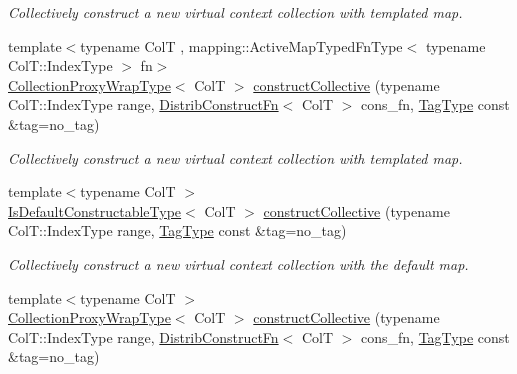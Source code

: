 \begin{DoxyCompactItemize}
\begin{DoxyCompactList}\small\item\em Collectively construct a new virtual context collection with templated map. \end{DoxyCompactList}\item 
{\footnotesize template$<$typename ColT , mapping\+::\+Active\+Map\+Typed\+Fn\+Type$<$ typename Col\+T\+::\+Index\+Type $>$ fn$>$ }\\\hyperlink{structvt_1_1vrt_1_1collection_1_1_collection_manager_a56458ed7f9bb22b631b9b3a745f42f94}{Collection\+Proxy\+Wrap\+Type}$<$ ColT $>$ \hyperlink{structvt_1_1vrt_1_1collection_1_1_collection_manager_a619d6e576f0d108e442b16ca4f68f1f3}{construct\+Collective} (typename Col\+T\+::\+Index\+Type range, \hyperlink{structvt_1_1vrt_1_1collection_1_1_collection_manager_a7503830bc133013d542856fa39834dcc}{Distrib\+Construct\+Fn}$<$ ColT $>$ cons\+\_\+fn, \hyperlink{namespacevt_a84ab281dae04a52a4b243d6bf62d0e52}{Tag\+Type} const \&tag=no\+\_\+tag)
\begin{DoxyCompactList}\small\item\em Collectively construct a new virtual context collection with templated map. \end{DoxyCompactList}\item 
{\footnotesize template$<$typename ColT $>$ }\\\hyperlink{structvt_1_1vrt_1_1collection_1_1_collection_manager_af8091fcb8218dad155ea028c9b5d283f}{Is\+Default\+Constructable\+Type}$<$ ColT $>$ \hyperlink{structvt_1_1vrt_1_1collection_1_1_collection_manager_a8b68495478d890c9b07bff01059be63e}{construct\+Collective} (typename Col\+T\+::\+Index\+Type range, \hyperlink{namespacevt_a84ab281dae04a52a4b243d6bf62d0e52}{Tag\+Type} const \&tag=no\+\_\+tag)
\begin{DoxyCompactList}\small\item\em Collectively construct a new virtual context collection with the default map. \end{DoxyCompactList}\item 
{\footnotesize template$<$typename ColT $>$ }\\\hyperlink{structvt_1_1vrt_1_1collection_1_1_collection_manager_a56458ed7f9bb22b631b9b3a745f42f94}{Collection\+Proxy\+Wrap\+Type}$<$ ColT $>$ \hyperlink{structvt_1_1vrt_1_1collection_1_1_collection_manager_ad68e773af13eaa96e58910b14264e8cb}{construct\+Collective} (typename Col\+T\+::\+Index\+Type range, \hyperlink{structvt_1_1vrt_1_1collection_1_1_collection_manager_a7503830bc133013d542856fa39834dcc}{Distrib\+Construct\+Fn}$<$ ColT $>$ cons\+\_\+fn, \hyperlink{namespacevt_a84ab281dae04a52a4b243d6bf62d0e52}{Tag\+Type} const \&tag=no\+\_\+tag)

\end{DoxyCompactItemize}
